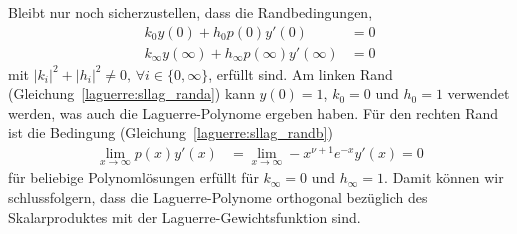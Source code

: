Bleibt nur noch sicherzustellen, dass die Randbedingungen,
\begin{align}
k_0 y(0) + h_0 p(0)y'(0)
 & =
0
\label{laguerre:sllag_randa}
\\
k_\infty y(\infty) + h_\infty p(\infty) y'(\infty)
 & =
0
\label{laguerre:sllag_randb}
\end{align}
mit $|k_i|^2 + |h_i|^2 \neq 0,\,\forall i \in \{0, \infty\}$, erfüllt sind.
Am linken Rand (Gleichung~\eqref{laguerre:sllag_randa}) kann $y(0) = 1$, $k_0 =
0$ und $h_0 = 1$ verwendet werden,
was auch die Laguerre-Polynome ergeben haben.
Für den rechten Rand ist die Bedingung (Gleichung~\eqref{laguerre:sllag_randb})
\begin{align*}
\lim_{x \rightarrow \infty} p(x) y'(x)
 & =
\lim_{x \rightarrow \infty} -x^{\nu + 1} e^{-x} y'(x)
=
0
\end{align*}
für beliebige Polynomlösungen erfüllt für $k_\infty=0$ und $h_\infty=1$.
Damit können wir schlussfolgern, dass die Laguerre-Polynome orthogonal
bezüglich des Skalarproduktes mit der Laguerre\--Gewichtsfunktion sind.
